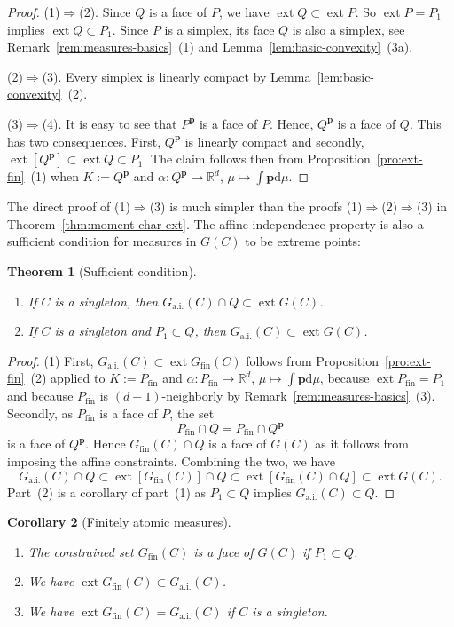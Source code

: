 \documentclass[a4paper,11pt,reqno]{amsart}
\numberwithin{equation}{section}
\theoremstyle{plain}
\newtheorem{theorem}{Theorem}[section]
\newtheorem{corollary}[theorem]{Corollary}
\theoremstyle{definition}
\newcommand{\bp}{\mathbf{p}}
\newcommand{\dd}{\mathrm{d}} %
\newcommand{\R}{\mathbb{R}} %
\DeclareMathOperator{\ext}{ext} %
\newcommand\ait{\mathrm{a.i.}}
\newcommand\fint{\mathrm{fin}}
\begin{document}
%
\begin{proof}
(1)$\Rightarrow$(2). 
Since $Q$ is a face of $P$, we have $\ext Q\subset\ext P$. So $\ext P=P_1$
implies $\ext Q\subset P_1$. Since $P$ is a simplex, its face $Q$ is also 
a simplex, see Remark~\ref{rem:measures-basics}~(1) and 
Lemma~\ref{lem:basic-convexity}~(3a).
\par
%
(2)$\Rightarrow$(3).
Every simplex is linearly compact by Lemma~\ref{lem:basic-convexity}~(2). 
\par
%
(3)$\Rightarrow$(4).
It is easy to see that $P^\bp$ is a face of $P$. Hence, $Q^\bp$ is a face 
of $Q$. This has two consequences. First, $Q^\bp$ is linearly compact and 
secondly, $\ext[Q^\bp]\subset\ext Q\subset P_1$. The claim follows then from 
Proposition~\ref{pro:ext-fin}~(1) when $K:=Q^\bp$ and 
$\alpha\colon Q^\bp\to\R^d$, $\mu\mapsto\int\bp\dd\mu$. 
\end{proof}
%
The direct proof of (1)$\Rightarrow$(3) is much simpler than the proofs
(1)$\Rightarrow$(2)$\Rightarrow$(3) in Theorem~\ref{thm:moment-char-ext}. 
The affine independence property is also a sufficient condition for measures 
in $G(C)$ to be extreme points:
\par
%
\begin{theorem}[Sufficient condition]\label{thm:moment-char-fin}~
\begin{enumerate}
\item 
If $C$ is a singleton, then $G_\ait(C)\cap Q\subset\ext G(C)$.
\item
If $C$ is a singleton and $P_1\subset Q$, then $G_\ait(C)\subset\ext G(C)$.
\end{enumerate}
\end{theorem}
%
\begin{proof}
(1) First, $G_\ait(C)\subset\ext G_\fint(C)$ follows from 
Proposition~\ref{pro:ext-fin}~(2) applied to $K:=P\!_\fint$ and 
$\alpha\colon P\!_\fint\to\R^d$, $\mu\mapsto\int\bp\dd\mu$, because 
$\ext P\!_\fint=P_1$ and because $P\!_\fint$ is $(d+1)$-neighborly by
Remark~\ref{rem:measures-basics}~(3). Secondly, as $P\!_\fint$ is a 
face of $P$, the set 
\[
P\!_\fint\cap Q = P\!_\fint\cap Q^\bp
\]
is a face of $Q^\bp$. Hence $G_\fint(C)\cap Q$ is a face of $G(C)$
as it follows from imposing the affine constraints. Combining the two, 
we have
\[
G_\ait(C)\cap Q
\subset 
\ext[G_\fint(C)]\cap Q
\subset
\ext[G_\fint(C)\cap Q]
\subset
\ext G(C).
\]
Part~(2) is a corollary of part~(1) as 
$P_1\subset Q$ implies $G_\ait(C)\subset Q$.
\end{proof}
%
\begin{corollary}[Finitely atomic measures]\label{cor:fin-atomic-ext}~
\begin{enumerate}
\item 
The constrained set $G_\fint(C)$ is a face of $G(C)$ if $P_1\subset Q$.
\item
We have $\ext G_\fint(C)\subset G_\ait(C)$.
\item
We have $\ext G_\fint(C)=G_\ait(C)$ if $C$ is a singleton.
\end{enumerate}
\end{corollary}
\end{document}
